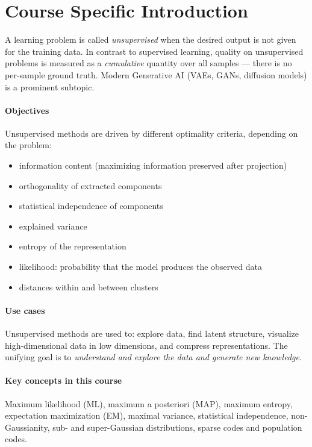 \documentclass[11pt, oneside]{book}
\begin{document}
\section{Course Specific Introduction}

A learning problem is called \emph{unsupervised} when the desired output is not given
for the training data.
In contrast to supervised learning, quality on unsupervised problems is measured as a
\emph{cumulative} quantity over all samples --- there is no per-sample ground truth.
Modern Generative AI (VAEs, GANs, diffusion models) is a prominent subtopic.

\paragraph{Objectives} Unsupervised methods are driven by different optimality criteria,
depending on the problem:
\begin{itemize}
  \item information content (maximizing information preserved after projection)
  \item orthogonality of extracted components
  \item statistical independence of components
  \item explained variance
  \item entropy of the representation
  \item likelihood: probability that the model produces the observed data
  \item distances within and between clusters
\end{itemize}

\paragraph{Use cases} Unsupervised methods are used to:
explore data, find latent structure, visualize high-dimensional data in low dimensions,
and compress representations.
The unifying goal is to \emph{understand and explore the data and generate new knowledge}.

\paragraph{Key concepts in this course}
Maximum likelihood (ML), maximum a posteriori (MAP), maximum entropy, expectation
maximization (EM), maximal variance, statistical independence, non-Gaussianity,
sub- and super-Gaussian distributions, sparse codes and population codes.
\end{document}
